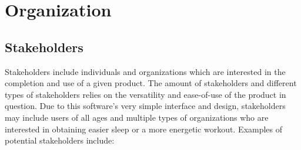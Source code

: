 \documentclass[letterpaper,english, 12pt]{scrreprt}
\begin{document}
\section{Organization}

\subsection{Stakeholders}
Stakeholders include individuals and organizations which are interested in the completion and use of a given product. The amount of stakeholders and different types of stakeholders relies on the versatility and ease-of-use of the product in question. Due to this software's very simple interface and design, stakeholders may include users of all ages and multiple types of organizations who are interested in obtaining easier sleep or a more energetic workout. Examples of potential stakeholders include:
\end{document}
